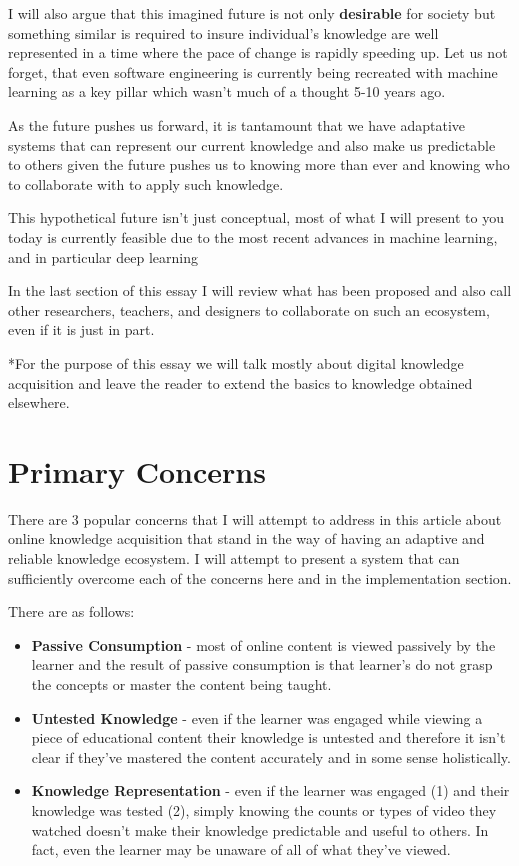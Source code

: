 \documentclass[]{book}
\providecommand{\tightlist}{%
  \setlength{\itemsep}{0pt}\setlength{\parskip}{0pt}}
\theoremstyle{definition}
\theoremstyle{definition}
\theoremstyle{definition}
\theoremstyle{remark}
\begin{document}
I will also argue that this imagined future is not only
\textbf{desirable} for society but something similar is required to
insure individual's knowledge are well represented in a time where the
pace of change is rapidly speeding up. Let us not forget, that even
software engineering is currently being recreated with machine learning
as a key pillar which wasn't much of a thought 5-10 years ago.

As the future pushes us forward, it is tantamount that we have
adaptative systems that can represent our current knowledge and also
make us predictable to others given the future pushes us to knowing more
than ever and knowing who to collaborate with to apply such knowledge.

This hypothetical future isn't just conceptual, most of what I will
present to you today is currently feasible due to the most recent
advances in machine learning, and in particular deep learning

In the last section of this essay I will review what has been proposed
and also call other researchers, teachers, and designers to collaborate
on such an ecosystem, even if it is just in part.

*For the purpose of this essay we will talk mostly about digital
knowledge acquisition and leave the reader to extend the basics to
knowledge obtained elsewhere.

\chapter{Primary Concerns}\label{primary-concerns}

There are 3 popular concerns that I will attempt to address in this
article about online knowledge acquisition that stand in the way of
having an adaptive and reliable knowledge ecosystem. I will attempt to
present a system that can sufficiently overcome each of the concerns
here and in the implementation section.

There are as follows:

\begin{itemize}
\tightlist
\item
  \textbf{Passive Consumption} - most of online content is viewed
  passively by the learner and the result of passive consumption is that
  learner's do not grasp the concepts or master the content being
  taught.
\item
  \textbf{Untested Knowledge} - even if the learner was engaged while
  viewing a piece of educational content their knowledge is untested and
  therefore it isn't clear if they've mastered the content accurately
  and in some sense holistically.
\item
  \textbf{Knowledge Representation} - even if the learner was engaged
  (1) and their knowledge was tested (2), simply knowing the counts or
  types of video they watched doesn't make their knowledge predictable
  and useful to others. In fact, even the learner may be unaware of all
  of what they've viewed.
\end{itemize}
\end{document}
